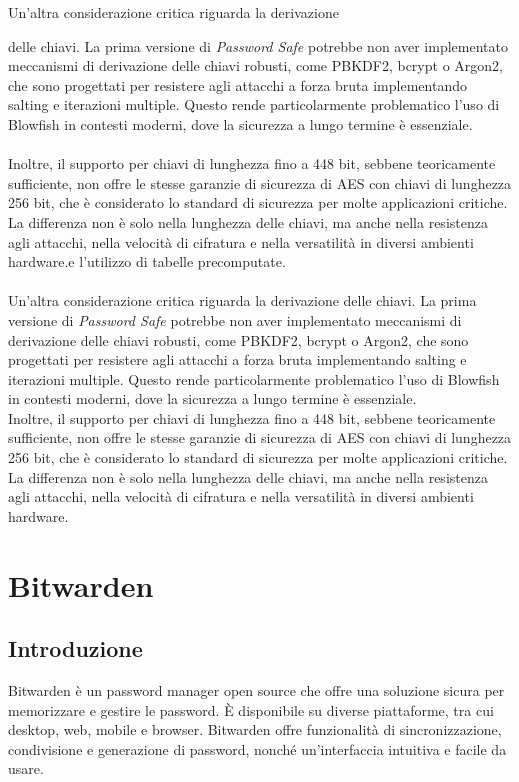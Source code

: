 \documentclass[a4paper,12pt]{report}
\begin{document}
		Un'altra considerazione critica riguarda la derivazione\par delle chiavi. La
		prima versione di \textit{Password Safe} potrebbe non aver implementato
		meccanismi di derivazione delle chiavi robusti, come PBKDF2, bcrypt o
		Argon2, che sono progettati per resistere agli attacchi a forza bruta
		implementando salting e iterazioni multiple. Questo rende
		particolarmente problematico l'uso di Blowfish in contesti moderni, dove
		la sicurezza a lungo termine è essenziale.\\\\
		Inoltre, il supporto per chiavi di lunghezza fino a 448 bit, sebbene
		teoricamente sufficiente, non offre le stesse garanzie di sicurezza di
		AES con chiavi di lunghezza 256 bit, che è considerato lo standard di
		sicurezza per molte applicazioni critiche. La differenza non è solo
		nella lunghezza delle chiavi, ma anche nella resistenza agli attacchi,
		nella velocità di cifratura e nella versatilità in diversi ambienti
		hardware.e l'utilizzo di tabelle precomputate.\\\\
		Un'altra considerazione critica riguarda la derivazione delle chiavi. La prima
		versione di \textit{Password Safe} potrebbe non aver implementato meccanismi di
		derivazione delle chiavi robusti, come PBKDF2, bcrypt o Argon2, che sono
		progettati per resistere agli attacchi a forza bruta implementando salting e
		iterazioni multiple. Questo rende particolarmente problematico l'uso di Blowfish
		in contesti moderni, dove la sicurezza a lungo termine è essenziale.\\
		Inoltre, il supporto per chiavi di lunghezza fino a 448 bit, sebbene
		teoricamente sufficiente, non offre le stesse garanzie di sicurezza di AES con
		chiavi di lunghezza 256 bit, che è considerato lo standard di sicurezza per
		molte applicazioni critiche. La differenza non è solo nella lunghezza delle
		chiavi, ma anche nella resistenza agli attacchi, nella velocità di cifratura e
		nella versatilità in diversi ambienti hardware.

		\chapter{Bitwarden}
		\section{Introduzione}
		\sloppy Bitwarden è un password manager open source che offre una soluzione sicura
		per memorizzare e gestire le password. È disponibile su diverse piattaforme,
		tra cui desktop, web, mobile e browser. Bitwarden offre funzionalità di
		sincronizzazione, condivisione e generazione di password, nonché un'interfaccia
		intuitiva e facile da usare.\\
		
\end{document}
